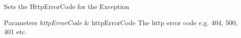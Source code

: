 Sets the Http\+Error\+Code for the Exception 


\begin{DoxyParams}{Parameters}
{\em http\+Error\+Code} & http\+Error\+Code The http error code e.\+g. 404, 500, 401 etc.\\
\hline
\end{DoxyParams}
